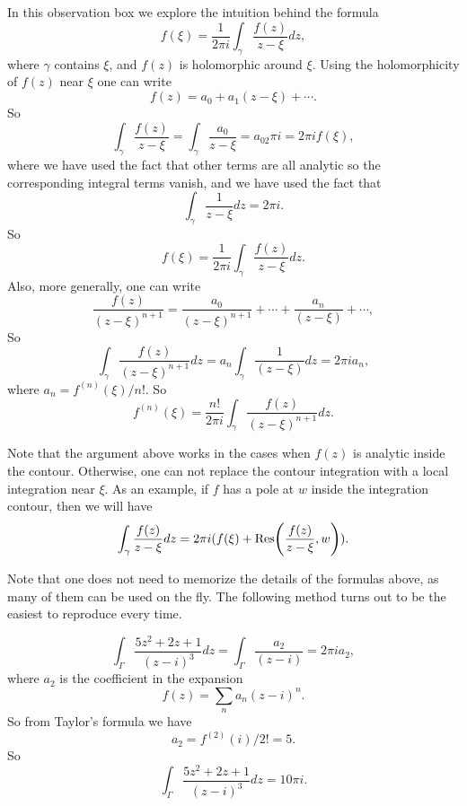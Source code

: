  \begin{observation}
 	In this observation box we explore the intuition behind the formula
 	\[ f(\xi) = \frac{1}{2\pi i}\int_\gamma \frac{f(z)}{z-\xi} dz, \]
 	where $ \gamma $ contains $ \xi $, and $ f(z) $ is holomorphic around $ \xi $. Using the holomorphicity of $ f(z) $ near $ \xi $ one can write
 	\[ f(z) = a_0 + a_1(z-\xi) + \cdots. \]
 	So
 	\[ \int_\gamma \frac{f(z)}{z-\xi} = \int_\gamma \frac{a_0}{z-\xi} = a_02\pi i = 2\pi i f(\xi), \]
 	where we have used the fact that other terms are all analytic so the corresponding integral terms vanish, and we have used the fact that
 	\[ \int_\gamma \frac{1}{z-\xi}dz = 2\pi i. \]
 	So 
 	\[ \boxed{f(\xi) = \frac{1}{2\pi i} \int_\gamma \frac{f(z)}{z-\xi}dz}. \]
 	Also, more generally, one can write
 	\[ \frac{f(z)}{(z-\xi)^{n+1}} = \frac{a_0}{(z-\xi)^{n+1}} + \cdots + \frac{a_n}{(z-\xi)} + \cdots, \]
 	So
 	\[ \int_\gamma \frac{f(z)}{(z-\xi)^{n+1}} dz = a_n \int_\gamma \frac{1}{(z-\xi)}dz = 2\pi i a_n,   \]
	where $ a_n = f^{(n)}(\xi)/n! $.
	So
	\[ f^{(n)}(\xi) = \frac{n!}{2\pi i}\int_\gamma \frac{f(z)}{(z-\xi)^{n+1}}dz. \]
 \end{observation}
 
 \begin{remark}
 	Note that the argument above works in the cases when $ f(z) $ is analytic inside the contour. Otherwise, one can not replace the contour integration with a local integration near $ \xi $. As an example, if $ f $ has a pole at $ w $ inside the integration contour, then we will have
 	\[ \int_\gamma \frac{f(z)}{z-\xi}dz = 2\pi i (f(\xi) + \Res(\frac{f(z)}{z-\xi},w)). \]
 \end{remark}
 
 
 
\begin{remark}
	Note that one does not need to memorize the details of the formulas above, as many of them can be used on the fly. The following method turns out to be the easiest to reproduce every time.
	
	\[ \int_\Gamma \frac{5z^2+2z+1}{(z-i)^3}dz  = \int_\Gamma \frac{a_2}{(z-i)} = 2\pi i a_2,  \]
	where $ a_2 $ is the coefficient in the expansion
	\[ f(z) = \sum_n a_n (z-i)^n. \]
	So from Taylor's formula we have 
	\[ a_2 = f^{(2)}(i)/2! = 5. \]
	So
	\[ \int_\Gamma \frac{5z^2+2z+1}{(z-i)^3}dz = 10\pi i. \]
\end{remark}